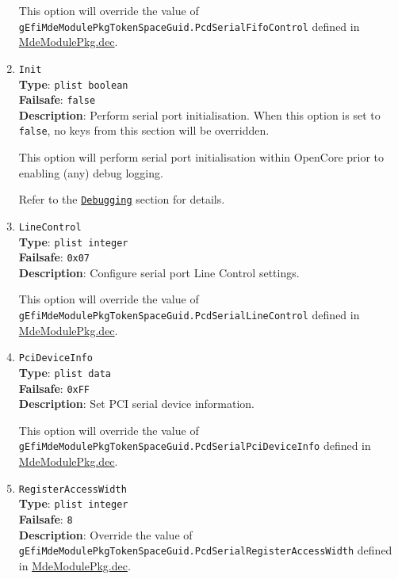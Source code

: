 \documentclass[]{article}
\begin{document}
\begin{enumerate}
  This option will override the value of \texttt{gEfiMdeModulePkgTokenSpaceGuid.PcdSerialFifoControl}
  defined in \href{https://github.com/acidanthera/audk/blob/master/MdeModulePkg/MdeModulePkg.dec}{MdeModulePkg.dec}.

\item
  \texttt{Init}\\
  \textbf{Type}: \texttt{plist\ boolean}\\
  \textbf{Failsafe}: \texttt{false}\\
  \textbf{Description}: Perform serial port initialisation.
  When this option is set to \texttt{false}, no keys from this section will be overridden.

  This option will perform serial port initialisation within OpenCore prior to enabling
  (any) debug logging.

  Refer to the \hyperref[troubleshootingdebug]{\texttt{Debugging}} section for details.

\item
  \texttt{LineControl}\\
  \textbf{Type}: \texttt{plist\ integer}\\
  \textbf{Failsafe}: \texttt{0x07}\\
  \textbf{Description}: Configure serial port Line Control settings.

  This option will override the value of \texttt{gEfiMdeModulePkgTokenSpaceGuid.PcdSerialLineControl}
  defined in \href{https://github.com/acidanthera/audk/blob/master/MdeModulePkg/MdeModulePkg.dec}{MdeModulePkg.dec}.

\item
  \texttt{PciDeviceInfo}\\
  \textbf{Type}: \texttt{plist\ data}\\
  \textbf{Failsafe}: \texttt{0xFF}\\
  \textbf{Description}: Set PCI serial device information.

  This option will override the value of \texttt{gEfiMdeModulePkgTokenSpaceGuid.PcdSerialPciDeviceInfo}
  defined in \href{https://github.com/acidanthera/audk/blob/master/MdeModulePkg/MdeModulePkg.dec}{MdeModulePkg.dec}.

\item
  \texttt{RegisterAccessWidth}\\
  \textbf{Type}: \texttt{plist\ integer}\\
  \textbf{Failsafe}: \texttt{8}\\
  \textbf{Description}: Override the value of \texttt{gEfiMdeModulePkgTokenSpaceGuid.PcdSerialRegisterAccessWidth}
  defined in \href{https://github.com/acidanthera/audk/blob/master/MdeModulePkg/MdeModulePkg.dec}{MdeModulePkg.dec}.


\end{enumerate}
\end{document}
